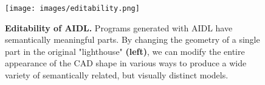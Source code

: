 \begin{figure}[htbp!]
  \centering
  \texttt{[image: images/editability.png]}
  \caption{\textbf{Editability of AIDL.} Programs generated with AIDL have semantically meaningful parts. By changing the geometry of a single part in the original "lighthouse" \textbf{(left)}, we can modify the entire appearance of the CAD shape in various ways to produce a wide variety of semantically related, but visually distinct models.} 
  \label{fig:editability}
\end{figure}



